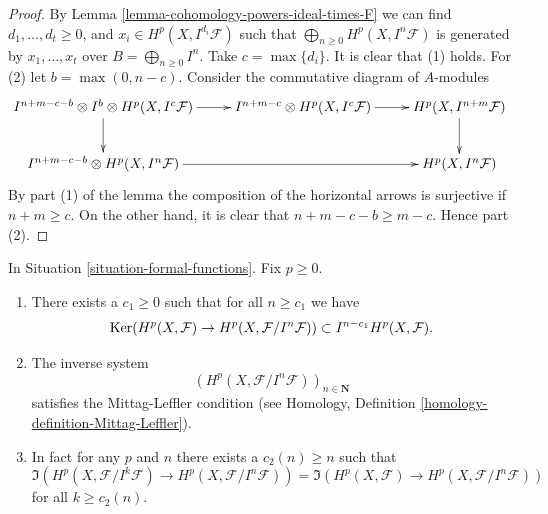 \begin{proof}
By Lemma \ref{lemma-cohomology-powers-ideal-times-F}
we can find $d_1, \ldots, d_t \geq 0$, and
$x_i \in H^p(X, I^{d_i}\mathcal{F})$ such that
$\bigoplus_{n \geq 0} H^p(X, I^n\mathcal{F})$ is generated
by $x_1, \ldots, x_t$ over $B = \bigoplus_{n \geq 0} I^n$.
Take $c = \max\{d_i\}$. It is clear that (1) holds.
For (2) let $b = \max(0, n - c)$.
Consider the commutative diagram of $A$-modules
$$
\xymatrix{
I^{n + m - c - b} \otimes I^b \otimes
H^p(X, I^c\mathcal{F}) \ar[r] \ar[d] &
I^{n + m - c} \otimes H^p(X, I^c\mathcal{F}) \ar[r] &
H^p(X, I^{n + m}\mathcal{F}) \ar[d] \\
I^{n + m - c - b} \otimes H^p(X, I^n\mathcal{F}) \ar[rr] & &
H^p(X, I^n\mathcal{F})
}
$$
By part (1) of the lemma the composition of the horizontal arrows
is surjective if $n + m \geq c$. On the other hand, it is clear
that $n + m - c - b \geq m - c$. Hence part (2).
\end{proof}

\begin{lemma}
\label{lemma-ML-cohomology-powers-ideal}
In Situation \ref{situation-formal-functions}.
Fix $p \geq 0$.
\begin{enumerate}
\item There exists a $c_1 \geq 0$ such that for all $n \geq c_1$
we have
$$
\mathop{\mathrm{Ker}}(
H^p(X, \mathcal{F}) \to H^p(X, \mathcal{F}/I^n\mathcal{F})
)
\subset
I^{n - c_1}H^p(X, \mathcal{F}).
$$
\item The inverse system
$$
\left(H^p(X, \mathcal{F}/I^n\mathcal{F})\right)_{n \in \mathbf{N}}
$$
satisfies the Mittag-Leffler condition (see
Homology, Definition \ref{homology-definition-Mittag-Leffler}).
\item In fact for any $p$ and $n$ there exists a $c_2(n) \geq n$
such that
$$
\Im(H^p(X, \mathcal{F}/I^k\mathcal{F})
\to H^p(X, \mathcal{F}/I^n\mathcal{F}))
=
\Im(H^p(X, \mathcal{F})
\to H^p(X, \mathcal{F}/I^n\mathcal{F}))
$$
for all $k \geq c_2(n)$.
\end{enumerate}
\end{lemma}

